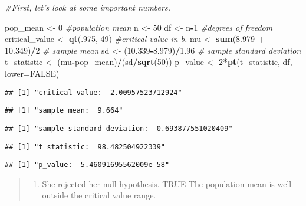 \documentclass[]{article}
\newenvironment{Shaded}{\begin{snugshade}}{\end{snugshade}}
\newcommand{\KeywordTok}[1]{\textcolor[rgb]{0.13,0.29,0.53}{\textbf{#1}}}
\newcommand{\DataTypeTok}[1]{\textcolor[rgb]{0.13,0.29,0.53}{#1}}
\newcommand{\DecValTok}[1]{\textcolor[rgb]{0.00,0.00,0.81}{#1}}
\newcommand{\FloatTok}[1]{\textcolor[rgb]{0.00,0.00,0.81}{#1}}
\newcommand{\StringTok}[1]{\textcolor[rgb]{0.31,0.60,0.02}{#1}}
\newcommand{\CommentTok}[1]{\textcolor[rgb]{0.56,0.35,0.01}{\textit{#1}}}
\newcommand{\OtherTok}[1]{\textcolor[rgb]{0.56,0.35,0.01}{#1}}
\newcommand{\OperatorTok}[1]{\textcolor[rgb]{0.81,0.36,0.00}{\textbf{#1}}}
\newcommand{\NormalTok}[1]{#1}
\providecommand{\tightlist}{%
  \setlength{\itemsep}{0pt}\setlength{\parskip}{0pt}}
\begin{document}
\begin{Shaded}
\begin{Highlighting}[]
\CommentTok{#First, let's look at some important numbers.}

\NormalTok{pop_mean <-}\StringTok{ }\DecValTok{0} \CommentTok{#population mean}
\NormalTok{n <-}\StringTok{ }\DecValTok{50}
\NormalTok{df <-}\StringTok{ }\NormalTok{n}\OperatorTok{-}\DecValTok{1} \CommentTok{#degrees of freedom}
\NormalTok{critical_value <-}\StringTok{ }\KeywordTok{qt}\NormalTok{(.}\DecValTok{975}\NormalTok{, }\DecValTok{49}\NormalTok{) }\CommentTok{#critical value in b.}
\NormalTok{mu <-}\StringTok{ }\KeywordTok{sum}\NormalTok{(}\FloatTok{8.979} \OperatorTok{+}\StringTok{ }\FloatTok{10.349}\NormalTok{)}\OperatorTok{/}\DecValTok{2} \CommentTok{# sample mean}
\NormalTok{sd <-}\StringTok{ }\NormalTok{(}\FloatTok{10.339}\OperatorTok{-}\FloatTok{8.979}\NormalTok{)}\OperatorTok{/}\FloatTok{1.96} \CommentTok{# sample standard deviation }
\NormalTok{t_statistic <-}\StringTok{  }\NormalTok{(mu}\OperatorTok{-}\NormalTok{pop_mean)}\OperatorTok{/}\NormalTok{(sd}\OperatorTok{/}\KeywordTok{sqrt}\NormalTok{(}\DecValTok{50}\NormalTok{))}
\NormalTok{p_value <-}\StringTok{ }\DecValTok{2}\OperatorTok{*}\KeywordTok{pt}\NormalTok{(t_statistic, df, }\DataTypeTok{lower=}\OtherTok{FALSE}\NormalTok{)}
\end{Highlighting}
\end{Shaded}

\begin{verbatim}
## [1] "critical value:  2.00957523712924"
\end{verbatim}

\begin{verbatim}
## [1] "sample mean:  9.664"
\end{verbatim}

\begin{verbatim}
## [1] "sample standard deviation:  0.693877551020409"
\end{verbatim}

\begin{verbatim}
## [1] "t statistic:  98.482504922339"
\end{verbatim}

\begin{verbatim}
## [1] "p_value:  5.46091695562009e-58"
\end{verbatim}

\begin{quote}
\begin{enumerate}
\def\labelenumi{\alph{enumi}.}
\tightlist
\item
  She rejected her null hypothesis. TRUE The population mean is well
  outside the critical value range.
\end{enumerate}
\end{quote}
\end{document}
